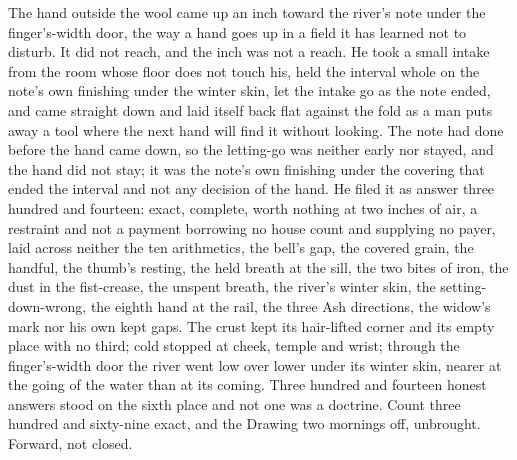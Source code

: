 The hand outside the wool came up an inch toward the river's note under the finger's-width door, the way a hand goes up in a field it has learned not to disturb. It did not reach, and the inch was not a reach. He took a small intake from the room whose floor does not touch his, held the interval whole on the note's own finishing under the winter skin, let the intake go as the note ended, and came straight down and laid itself back flat against the fold as a man puts away a tool where the next hand will find it without looking. The note had done before the hand came down, so the letting-go was neither early nor stayed, and the hand did not stay; it was the note's own finishing under the covering that ended the interval and not any decision of the hand. He filed it as answer three hundred and fourteen: exact, complete, worth nothing at two inches of air, a restraint and not a payment borrowing no house count and supplying no payer, laid across neither the ten arithmetics, the bell's gap, the covered grain, the handful, the thumb's resting, the held breath at the sill, the two bites of iron, the dust in the fist-crease, the unspent breath, the river's winter skin, the setting-down-wrong, the eighth hand at the rail, the three Ash directions, the widow's mark nor his own kept gaps. The crust kept its hair-lifted corner and its empty place with no third; cold stopped at cheek, temple and wrist; through the finger's-width door the river went low over lower under its winter skin, nearer at the going of the water than at its coming. Three hundred and fourteen honest answers stood on the sixth place and not one was a doctrine. Count three hundred and sixty-nine exact, and the Drawing two mornings off, unbrought. Forward, not closed.
